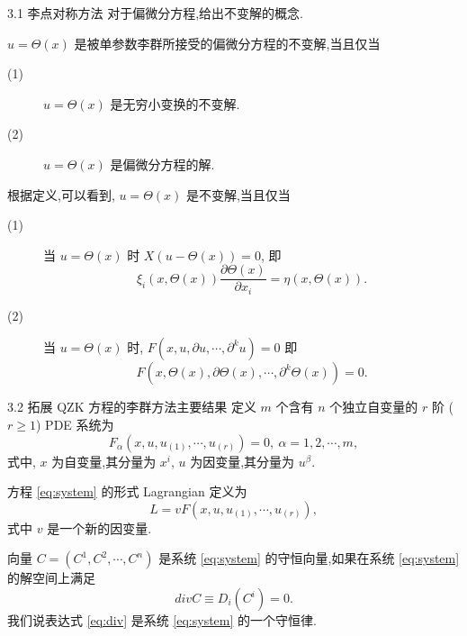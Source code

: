 \documentclass{beamer}
\begin{document}
\begin{frame}{3.1 李点对称方法}
对于偏微分方程,给出不变解的概念.
\begin{definition}[不变解]
	$u=\Theta(x)$ 是被单参数李群所接受的偏微分方程的不变解,当且仅当
	\begin{description}
		\item[(1)] $u=\Theta(x)$ 是无穷小变换的不变解.
		\item[(2)] $u=\Theta(x)$ 是偏微分方程的解.
	\end{description}
\end{definition}

根据定义,可以看到, $u=\Theta(x)$ 是不变解,当且仅当
\begin{description}
	\item[(1)] 当 $u=\Theta(x)$ 时 $X(u-\Theta(x))=0$, 即
	\begin{equation*}
		\xi_i(x,\Theta(x))\frac{\partial \Theta(x)}{\partial x_i}=\eta(x,\Theta(x)).
	\end{equation*}
	\item[(2)] 当 $u=\Theta(x)$ 时, $F(x,u,\partial u,\cdots,\partial ^k u)=0$ 即
	\begin{equation*}
		F(x,\Theta(x),\partial \Theta(x),\cdots,\partial ^k \Theta(x))=0.
	\end{equation*}
\end{description}
\end{frame}

\begin{frame}{3.2 拓展 QZK 方程的李群方法主要结果}
\qquad 定义 $m$ 个含有 $n$ 个独立自变量的 $r$ 阶  ($r\geq1$) PDE 系统为
\begin{equation}\label{eq:system}
F_\alpha(x,u,u_{(1)},\cdots,u_{(r)})=0,~ \alpha=1,2,\cdots,m,
\end{equation}
式中, $x$ 为自变量,其分量为 $x^i$, $u$ 为因变量,其分量为 $u^\beta$.

\begin{definition}[形式 Lagrangian]
	方程 \eqref{eq:system} 的形式 Lagrangian 定义为
	\begin{equation*}
		L=vF(x,u,u_{(1)},\cdots,u_{(r)}),
	\end{equation*}
	式中 $v$ 是一个新的因变量.
\end{definition}

\qquad 向量 $C=(C^1,C^2,\cdots,C^n)$ 是系统 \eqref{eq:system} 的守恒向量,如果在系统 \eqref{eq:system} 的解空间上满足
\begin{equation}\label{eq:div}
divC\equiv D_i(C^i)=0.
\end{equation}
我们说表达式 \eqref{eq:div} 是系统 \eqref{eq:system} 的一个守恒律.
\end{frame}
\end{document}
